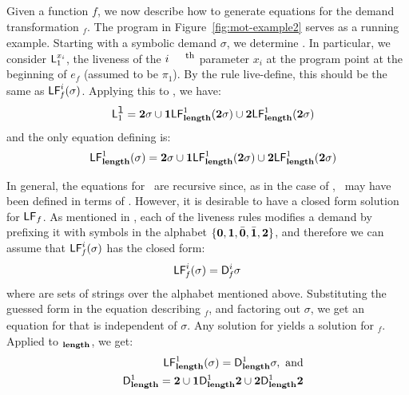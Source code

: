 \documentclass[9pt]{sigplanconf}
\begin{document}
Given  a  function  $\mathit{f}$,  we now  describe  how  to  generate
equations  for the  demand  transformation \Lfonly$_\mathit{f}$.   The
program in Figure~\ref{fig:mot-example2} serves  as a running example.
Starting   with    a   symbolic   demand   $\sigma$,    we   determine
.   In  particular, we  consider
$\mathsf{L}_{{1}}^{x_i}$,  the liveness  of  the $i^{\mbox{\footnotesize  th}}$
parameter   $x_i$  at   the  program   point  at   the  beginning   of
$e_{\mathit{f}}$   (assumed  to   be  $\pi_1$).   By  the   rule  {\sc
  live-define},      this     should      be      the     same      as
$\mathsf{LF}_{\mathit f}^{i}( {\mathit \sigma})$. Applying this to \length, we have:
\begin{eqnarray*}
&& \mathsf{L}_{{1}}^{\mbox{\tt l}} = {\mathbf{2}}\sigma \cup \mathbf{1}\mathsf{LF}_{\mathit {\mathbf{length}}}^{1}( {\mathit {{\mathbf{2}}}\sigma})
  \cup {\mathbf{2}}\mathsf{LF}_{\mathit {\mathbf{length}}}^{1}( {\mathit {{\mathbf{2}}}\sigma})
\end{eqnarray*}
and  the only equation defining \Lfone{\length} is:
  \begin{eqnarray*}
   && \mathsf{LF}_{\mathit {\mathbf{length}}}^{1}( {\mathit \sigma})
    =  {\mathbf{2}}\sigma \cup \mathbf{1}\mathsf{LF}_{\mathit {\mathbf{length}}}^{1}( {\mathit {{\mathbf{2}}}\sigma}) \cup
{\mathbf{2}}\mathsf{LF}_{\mathit {\mathbf{length}}}^{1}( {\mathit {{\mathbf{2}}}\sigma})
\end{eqnarray*}

In general, the equations for  \Lfonly\ are recursive since, as in the
case  of  \length,  \  may   have  been  defined  in  terms  of
.  However,  it is desirable  to have a  closed form
solution for $\mathsf{LF}_{\mathit \mathit{f}}$.  As mentioned in \cite{asati14lgc},
each  of the liveness  rules modifies  a demand  by prefixing  it with
symbols  in the  alphabet  $\lbrace \mathbf{0},  \mathbf{1},\bar{\mathbf{0}}, \bar{\mathbf{1}},  {\mathbf{2}}
\rbrace$, and therefore we can assume that $\mathsf{LF}_{\mathit f}^{i}( {\mathit \sigma})$ has the
closed form:
\begin{eqnarray}
\label{eq:LF:DI}
  \mathsf{LF}_{\mathit f}^{i}( {\mathit \sigma}) = \mathsf{D}_{\mathit f}^{i}\sigma
\end{eqnarray}
where  are sets of strings over the alphabet mentioned above.
Substituting   the   guessed   form   in   the   equation   describing
\Lfonly$_{\mathit f}$, and factoring  out $\sigma$, we get an equation
for   that  is  independent of  $\sigma$.   Any solution  for
  yields a  solution for  \Lfonly$_{\mathit f}$.   Applied to
\Lfonly$_{\mathit {\mathbf{length}}}$, we get:
  \begin{eqnarray*}
&&  \mathsf{LF}_{\mathit {\mathbf{length}} }^{1}( {\mathit \sigma}) = \mathsf{D}_{\mathit {\mathbf{length}}}^{1}\sigma,~\mbox{and}\\
&&   \mathsf{D}_{\mathit {\mathbf{length}}}^{1} = {\mathbf{2}} \cup \mathbf{1}\mathsf{D}_{\mathit {\mathbf{length}}}^{1}{\mathbf{2}}
       \cup {\mathbf{2}}\mathsf{D}_{\mathit {\mathbf{length}}}^{1}{{\mathbf{2}}}
  \end{eqnarray*}
\end{document}
